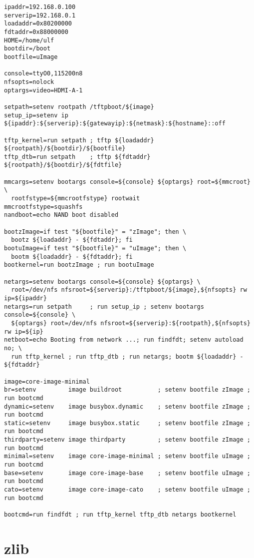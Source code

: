 \begin{verbatim}
ipaddr=192.168.0.100
serverip=192.168.0.1
loadaddr=0x80200000
fdtaddr=0x88000000
HOME=/home/ulf
bootdir=/boot
bootfile=uImage

console=ttyO0,115200n8
nfsopts=nolock
optargs=video=HDMI-A-1

setpath=setenv rootpath /tftpboot/${image}
setup_ip=setenv ip ${ipaddr}:${serverip}:${gatewayip}:${netmask}:${hostname}::off

tftp_kernel=run setpath ; tftp ${loadaddr} ${rootpath}/${bootdir}/${bootfile}
tftp_dtb=run setpath    ; tftp ${fdtaddr}  ${rootpath}/${bootdir}/${fdtfile}

mmcargs=setenv bootargs console=${console} ${optargs} root=${mmcroot} \
  rootfstype=${mmcrootfstype} rootwait
mmcrootfstype=squashfs
nandboot=echo NAND boot disabled

bootzImage=if test "${bootfile}" = "zImage"; then \
  bootz ${loadaddr} - ${fdtaddr}; fi
bootuImage=if test "${bootfile}" = "uImage"; then \
  bootm ${loadaddr} - ${fdtaddr}; fi
bootkernel=run bootzImage ; run bootuImage

netargs=setenv bootargs console=${console} ${optargs} \
  root=/dev/nfs nfsroot=${serverip}:/tftpboot/${image},${nfsopts} rw ip=${ipaddr}
netargs=run setpath     ; run setup_ip ; setenv bootargs console=${console} \
  ${optargs} root=/dev/nfs nfsroot=${serverip}:${rootpath},${nfsopts} rw ip=${ip}
netboot=echo Booting from network ...; run findfdt; setenv autoload no; \
  run tftp_kernel ; run tftp_dtb ; run netargs; bootm ${loadaddr} - ${fdtaddr}

image=core-image-minimal
br=setenv         image buildroot          ; setenv bootfile zImage ; run bootcmd
dynamic=setenv    image busybox.dynamic    ; setenv bootfile zImage ; run bootcmd
static=setenv     image busybox.static     ; setenv bootfile zImage ; run bootcmd
thirdparty=setenv image thirdparty         ; setenv bootfile zImage ; run bootcmd
minimal=setenv    image core-image-minimal ; setenv bootfile uImage ; run bootcmd
base=setenv       image core-image-base    ; setenv bootfile uImage ; run bootcmd
cato=setenv       image core-image-cato    ; setenv bootfile uImage ; run bootcmd

bootcmd=run findfdt ; run tftp_kernel tftp_dtb netargs bootkernel
\end{verbatim}



\clearpage

\section{zlib}

